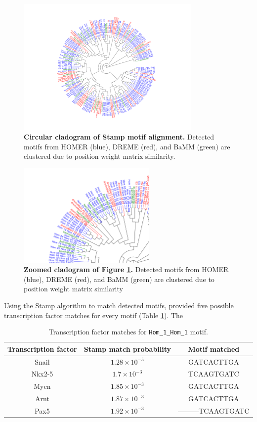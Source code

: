 \documentclass[12pt]{article}
\begin{document}
\begin{figure}[!htbp]
\centering
\includegraphics[width= 0.8\textwidth]{stampTree.pdf} 
\caption{{\bf Circular cladogram of Stamp motif alignment.} Detected motifs from HOMER (blue),  DREME (red), and BaMM (green) are clustered due to position weight matrix similarity. }
\label{mainStampTree}
\end{figure}

\begin{figure}[!htbp]
\centering
\includegraphics[width= 0.6\textwidth]{stampTreeDetail.pdf} 
\caption{{\bf Zoomed cladogram of Figure \ref{mainStampTree}.} Detected motifs from HOMER (blue),  DREME (red), and BaMM (green) are clustered due to position weight matrix similarity}
\label{treeDetail}
\end{figure}

Using the Stamp algorithm to match detected motifs, provided five possible transcription factor matches for every motif (Table \ref{5tfs}). The 

\begin{table}[!htbp]
\caption{Transcription factor matches for \texttt{Hom\_1\_Hom\_1} motif.}
\label{5tfs}
\centering
\begin{tabular}{ccc}
\toprule[0.2em]
Transcription factor & Stamp match probability & Motif matched \\
\midrule[0.1em]
Snail & $1.28\times10^{-5}$ & GATCACTTGA\\
Nkx2-5 & $1.7\times10^{-3}$ & TCAAGTGATC\\
Mycn & $1.85\times10^{-3}$ & GATCACTTGA\\
Arnt & $1.87\times10^{-3}$ & GATCACTTGA\\
Pax5 & $1.92\times10^{-3}$ & ---------TCAAGTGATC\\
\bottomrule[0.2em]
\end{tabular}
\end{table}
\end{document}
